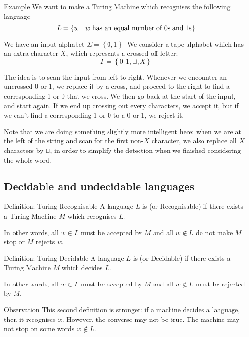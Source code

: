 \documentclass[a4paper]{article}
\begin{document}
\begin{parag}{Example}
    We want to make a Turing Machine which recognises the following language: 
    \[L = \left\{w \suchthat w \text{ has an equal number of 0s and 1s}\right\}\]

    We have an input alphabet $\Sigma = \left\{0, 1\right\}$. We consider a tape alphabet which has an extra character $X$, which represents a crossed off letter: 
    \[\Gamma = \left\{0, 1, \sqcup, X\right\}\]
    
    The idea is to scan the input from left to right. Whenever we encounter an uncrossed 0 or 1, we replace it by a cross, and proceed to the right to find a corresponding 1 or 0 that we cross. We then go back at the start of the input, and start again. If we end up crossing out every characters, we accept it, but if we can't find a corresponding 1 or 0 to a 0 or 1, we reject it.


    Note that we are doing something slightly more intelligent here: when we are at the left of the string and scan for the first non-$X$ character, we also replace all $X$ characters by $\sqcup$, in order to simplify the detection when we finished considering the whole word.
\end{parag}

\subsection{Decidable and undecidable languages}

\begin{parag}{Definition: Turing-Recognisable}
    A language $L$ is  (or Recognisable) if there exists a Turing Machine $M$ which recognises $L$.

    In other words, all $w \in L$ must be accepted by $M$ and all $w \not \in L$ do not make $M$ stop or $M$ rejects $w$.
\end{parag}

\begin{parag}{Definition: Turing-Decidable}
    A language $L$ is  (or Decidable) if there exists a Turing Machine $M$ which decides $L$.

    In other words, all $w \in L$ must be accepted by $M$ and all $w \not \in L$ must be rejected by $M$.

    \begin{subparag}{Observation}
        This second definition is stronger: if a machine decides a language, then it recognises it. However, the converse may not be true. The machine may not stop on some words $w \not\in L$.
    \end{subparag}
\end{parag}
\end{document}
